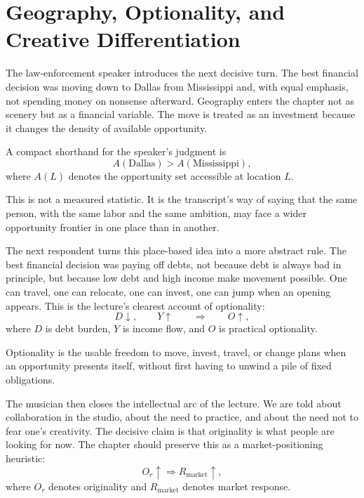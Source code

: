 \section{Geography, Optionality, and Creative Differentiation}

The law-enforcement speaker introduces the next decisive turn. The best financial decision was moving down to Dallas from Mississippi and, with equal emphasis, not spending money on nonsense afterward. Geography enters the chapter not as scenery but as a financial variable. The move is treated as an investment because it changes the density of available opportunity.

A compact shorthand for the speaker's judgment is
\begin{equation}
A(\text{Dallas}) > A(\text{Mississippi}),
\end{equation}
where \(A(L)\) denotes the opportunity set accessible at location \(L\).

\begin{remark}
This is not a measured statistic. It is the transcript's way of saying that the same person, with the same labor and the same ambition, may face a wider opportunity frontier in one place than in another.
\end{remark}

The next respondent turns this place-based idea into a more abstract rule. The best financial decision was paying off debts, not because debt is always bad in principle, but because low debt and high income make movement possible. One can travel, one can relocate, one can invest, one can jump when an opening appears. This is the lecture's clearest account of optionality:
\begin{equation}
D \downarrow,\qquad Y \uparrow
\qquad \Longrightarrow \qquad
O \uparrow,
\end{equation}
where \(D\) is debt burden, \(Y\) is income flow, and \(O\) is practical optionality.

\begin{definition}
Optionality is the usable freedom to move, invest, travel, or change plans when an opportunity presents itself, without first having to unwind a pile of fixed obligations.
\end{definition}

The musician then closes the intellectual arc of the lecture. We are told about collaboration in the studio, about the need to practice, and about the need not to fear one's creativity. The decisive claim is that originality is what people are looking for now. The chapter should preserve this as a market-positioning heuristic:
\begin{equation}
O_r \uparrow \Longrightarrow R_{\text{market}} \uparrow,
\end{equation}
where \(O_r\) denotes originality and \(R_{\text{market}}\) denotes market response.

